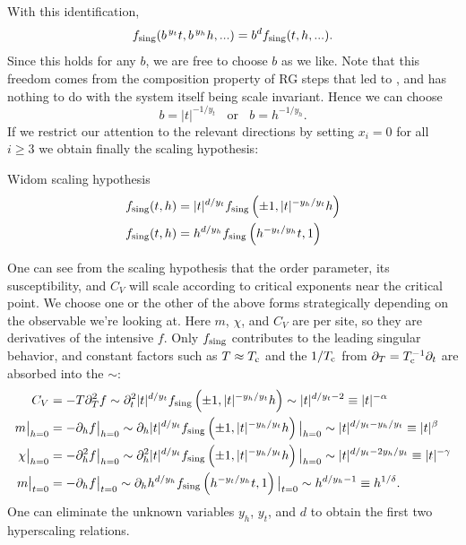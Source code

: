 With this identification,
\begin{equation}
  f_{\text{sing}}(b^{\,y_t}t,b^{\,y_h}h,...)=b^df_{\text{sing}}(t,h,...).
\end{equation}
Since this holds for any $b$, we are free to choose $b$ as we like. Note that
this freedom comes from the composition property of RG steps that led to
, and has nothing to do with the system itself being
scale invariant. Hence we can choose
\begin{equation}
  b=|t|^{-1/y_t}~~~~\text{or}~~~~b=h^{-1/y_h}.
\end{equation} 
If we restrict our attention to the relevant directions by setting $x_i=0$ for all $i\geq3$
we obtain finally the scaling hypothesis:
\begin{theorem}{Widom scaling hypothesis}{}
  \begin{equation*}\begin{aligned}
    f_{\text{sing}}(t,h)&=|t|^{d/y_t}f_{\text{sing}}\left(\pm1,|t|^{-y_h/y_t}h\right)\\
    f_{\text{sing}}(t,h)&=h^{d/y_h}f_{\text{sing}}\left(h^{-y_t/y_h}t,1\right)
  \end{aligned}\end{equation*}
\end{theorem}

One can see from the scaling hypothesis that the order parameter, its
susceptibility, and $C_V$ will scale according to critical exponents
near the critical point. We choose one or the other of the above forms
strategically depending on the observable we're looking at. Here $m$, $\chi$,
and $C_V$ are per site, so they are derivatives of the intensive $f$. Only
$f_{\text{sing}}$ contributes to the leading singular behavior, and constant factors such
as $T\approx T_{\rm c}$ and the $1/T_{\rm c}$ from $\partial_T=T_{\rm c}^{-1}\partial_t$ are absorbed
into the $\sim$:
\begin{equation}\begin{aligned}
  C_V&=-T\partial_T^2 f
     \sim\partial_t^2 |t|^{d/y_t}f_{\text{sing}}\left(\pm1,|t|^{-y_h/y_t}h\right)
     \sim|t|^{d/y_t-2}
     \equiv|t|^{-\alpha}\\
  m\big|_{h=0}&=-\partial_h f\big|_{h=0}
     \sim\partial_h |t|^{d/y_t}f_{\text{sing}}\left(\pm1,|t|^{-y_h/y_t}h\right)\big|_{h=0}
     \sim|t|^{d/y_t-y_h/y_t}
     \equiv|t|^{\beta}\\
  \chi\big|_{h=0}&=-\partial^2_h f\big|_{h=0}
     \sim\partial^2_h |t|^{d/y_t}f_{\text{sing}}\left(\pm1,|t|^{-y_h/y_t}h\right)\big|_{h=0}
     \sim|t|^{d/y_t-2y_h/y_t}
     \equiv|t|^{-\gamma}\\
  m\big|_{t=0}&=-\partial_h f\big|_{t=0}
     \sim\partial_h h^{d/y_h}f_{\text{sing}}\left(h^{-y_t/y_h}t,1\right)\big|_{t=0}
     \sim h^{d/y_h-1}
     \equiv h^{1/\delta}.
\end{aligned}\end{equation}
One can eliminate the unknown variables $y_h$, $y_t$, and $d$ to obtain
the first two hyperscaling relations.

